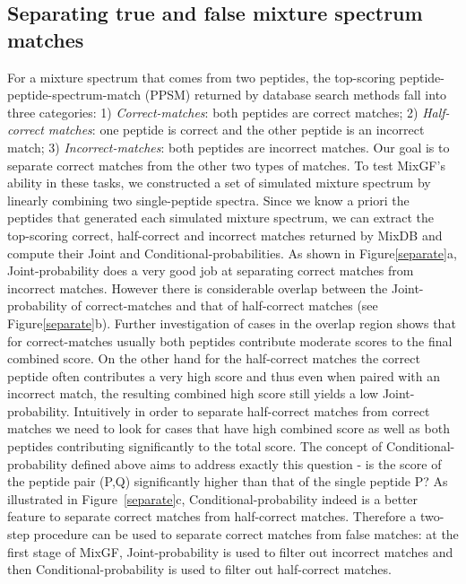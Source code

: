 \documentclass[runningheads,a4paper]{llncs}
\begin{document}
\subsection*{Separating true and false mixture spectrum matches}
For a mixture spectrum that comes from two peptides, the top-scoring peptide-peptide-spectrum-match (PPSM) returned by database search methods fall into three categories: 1) \emph{Correct-matches}: both peptides are correct matches; 2) \emph{Half-correct matches}: one peptide is correct and the other peptide is an incorrect match; 3) \emph{Incorrect-matches}: both peptides are incorrect matches.  Our goal is to separate correct matches from the other two types of matches.  To test MixGF's ability in these tasks, we constructed a set of simulated mixture spectrum by linearly combining two single-peptide spectra.  Since we know a priori the peptides that generated each simulated mixture spectrum, we can extract the top-scoring correct, half-correct and incorrect matches returned by MixDB and compute their Joint and Conditional-probabilities.  As shown in Figure\ref{separate}a, Joint-probability does a very good job at separating correct matches from incorrect matches.  However there is considerable overlap between the Joint-probability of correct-matches and that of half-correct matches (see Figure\ref{separate}b).  Further investigation of cases in the overlap region shows that for correct-matches usually both peptides contribute moderate scores to the final combined score.  On the other hand for the half-correct matches the correct peptide often contributes a very high score and thus even when paired with an incorrect match, the resulting combined high score still yields a low Joint-probability. Intuitively in order to separate half-correct matches from correct matches we need to look for cases that have high combined score as well as both peptides contributing significantly to the total score.  The concept of Conditional-probability defined above aims to address exactly this question - is the score of the peptide pair (P,Q) significantly higher than that of the single peptide P? As illustrated in Figure~\ref{separate}c, Conditional-probability indeed is a better feature to separate correct matches from half-correct matches. Therefore a two-step procedure can be used to separate correct matches from false matches: at the first stage of MixGF, Joint-probability is used to filter out incorrect matches and then Conditional-probability is used to filter out half-correct matches.
\end{document}
